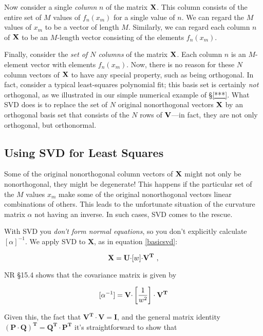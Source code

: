\documentclass[psfig,preprint]{aastex}
\begin{document}
Now consider a single {\it column} $n$ of the matrix $\bf X$. This
column consists of the entire set of $M$ values of $f_n(x_m)$ for a
single value of $n$. We can regard the $M$ values of $x_m$ to be a
vector of length $M$. Similarly, we can regard each column $n$ of $\bf
X$ to be an $M$-length vector consisting of the elements $f_n(x_m)$.

Finally, consider the {\it set of $N$ columns} of the matrix $\bf X$. Each
column $n$ is an $M$-element vector with elements $f_n(x_m)$. 
Now, there is no reason for these $N$ column vectors
of $\bf X$ to have any special property, such as being orthogonal. In
fact, consider a typical least-squares polynomial fit; this basis set is
certainly {\it not} orthogonal, as we illustrated in our simple
numerical example of \S \ref{***}. 
What SVD does is to replace the set of $N$ original nonorthogonal
vectors $\bf X$ by an orthogonal basis set that consists of the $N$ rows
of $\bf V$---in fact, they are not only orthogonal, but
orthonormal. 

\subsection{Using SVD for Least Squares} \label{nonsquare}

Some of the original nonorthogonal column vectors of $\bf X$ might
not only be nonorthogonal, they might be degenerate! This happens if the
particular set of the $M$ values $x_m$ make some of the original
nonorthogonal vectors linear combinations of others. This leads to the
unfortunate situation of the curvature matrix $\alpha$ not having an
inverse. In such cases, SVD comes to the rescue.


With SVD you {\it don't form normal equations}, so you don't explicitly
calculate $[\alpha]^{-1}$. We apply SVD to $\mathbf X$, as in equation
\ref{basicsvd}:

\begin{equation} \label{basicsvd0}
{\bf X} = {\bf U \cdot} [ w ] {\bf \cdot V^T}
\ ,
\end{equation}

\noindent NR \S 15.4 shows that the covariance matrix is given by

\begin{equation} \label{alphainveqn}
[\alpha ^{-1}] = {\bf V \cdot} \left[ 1 \over w^2 \right] \cdot {\bf V^T}
\end{equation}

\noindent Given this, the fact that $\mathbf{V^T \cdot V = I}$, and the general
matrix identity $\mathbf{(P \cdot Q)^T = Q^T \cdot P^T}$ it's
straightforward to show that 
\end{document}
